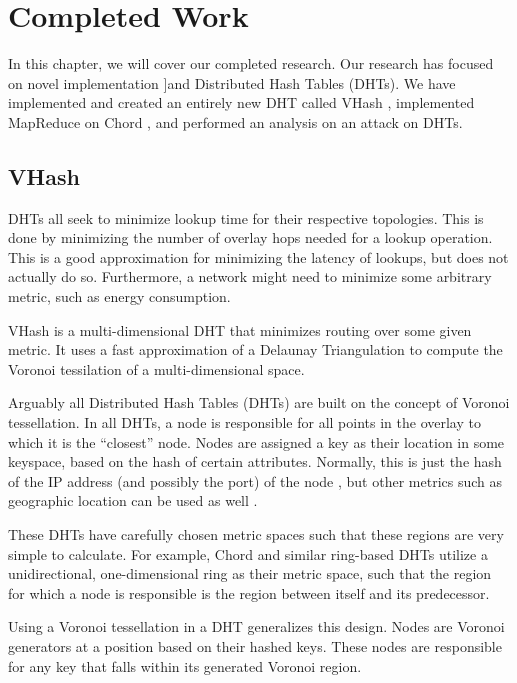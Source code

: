 \chapter{Completed Work}
\label{chapter:prev}

In this chapter, we will cover our completed research.
Our research has focused on novel implementation ]and Distributed Hash Tables (DHTs).
We have implemented and created an entirely new DHT called VHash \cite{vhash}, implemented MapReduce on Chord \cite{chordreduce}, and performed an analysis on an attack on DHTs.


\section{VHash}
DHTs all seek to minimize lookup time for their respective topologies.
This is done by minimizing the number of overlay hops needed for a lookup operation.
This is a good approximation for minimizing the latency of lookups, but does not actually do so.
Furthermore, a network might need to minimize some arbitrary metric, such as energy consumption.

VHash is a multi-dimensional DHT that minimizes routing over some given metric.
It uses a fast approximation of a Delaunay Triangulation to compute the Voronoi tessilation of a multi-dimensional space.



Arguably all Distributed Hash Tables (DHTs) are built on the concept of Voronoi tessellation.
In all DHTs, a node is responsible for all points in the overlay to which it is the ``closest'' node.
Nodes are assigned a key as their location in some keyspace, based on the hash of certain attributes.
Normally, this is just the hash of the IP address (and possibly the port) of the node \cite{chord} \cite{kademlia} \cite{can} \cite{pastry}, but other metrics such as geographic location can be used as well \cite{ratnasamy2002ght}.

These DHTs have carefully chosen metric spaces such that these regions are very simple to calculate.
For example, Chord \cite{chord} and similar ring-based DHTs \cite{symphony} utilize a unidirectional, one-dimensional ring as their metric space, such that the region for which a node is responsible is the region between itself and its predecessor.

Using a Voronoi tessellation in a DHT generalizes this design. 
Nodes are Voronoi generators at a position based on their hashed keys.
These nodes are responsible for any key that falls within its generated Voronoi region.

